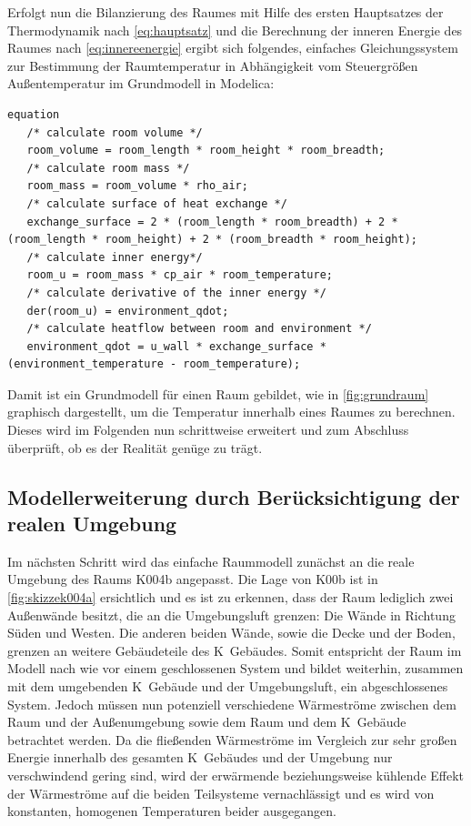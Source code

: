 Erfolgt nun die Bilanzierung des Raumes mit Hilfe des ersten Hauptsatzes der Thermodynamik nach \ref{eq:hauptsatz} und die Berechnung der inneren Energie des Raumes nach \ref{eq:innereenergie} ergibt sich folgendes, einfaches Gleichungssystem zur Bestimmung der Raumtemperatur in Abhängigkeit vom Steuergrößen Außentemperatur im Grundmodell in Modelica:

\begin{lstlisting}[language=Modelica,caption={Einfaches Gleichungssystem für das Grundmodell des Raumes in Modelica}, label=lst:grundraum]
equation
   /* calculate room volume */
   room_volume = room_length * room_height * room_breadth;
   /* calculate room mass */
   room_mass = room_volume * rho_air;
   /* calculate surface of heat exchange */
   exchange_surface = 2 * (room_length * room_breadth) + 2 * (room_length * room_height) + 2 * (room_breadth * room_height);
   /* calculate inner energy*/
   room_u = room_mass * cp_air * room_temperature;
   /* calculate derivative of the inner energy */
   der(room_u) = environment_qdot;
   /* calculate heatflow between room and environment */
   environment_qdot = u_wall * exchange_surface * (environment_temperature - room_temperature);
\end{lstlisting}

Damit ist ein Grundmodell für einen Raum gebildet, wie in \ref{fig:grundraum} graphisch dargestellt, um die Temperatur innerhalb eines Raumes zu berechnen. Dieses wird im Folgenden nun schrittweise erweitert und zum Abschluss überprüft, ob es der Realität genüge zu trägt.


\subsection{Modellerweiterung durch Berücksichtigung der realen Umgebung}

Im nächsten Schritt wird das einfache Raummodell zunächst an die reale Umgebung des Raums K004b angepasst. Die Lage von K00b ist in \ref{fig:skizzek004a} ersichtlich und es ist zu erkennen, dass der Raum lediglich zwei Außenwände besitzt, die an die Umgebungsluft grenzen: Die Wände in Richtung Süden und Westen. Die anderen beiden Wände, sowie die Decke und der Boden, grenzen an weitere Gebäudeteile des K~Gebäudes. Somit entspricht der Raum im Modell nach wie vor einem geschlossenen System und bildet weiterhin, zusammen mit dem umgebenden K~Gebäude und der Umgebungsluft, ein abgeschlossenes System. Jedoch müssen nun potenziell verschiedene Wärmeströme zwischen dem Raum und der Außenumgebung sowie dem Raum und dem K~Gebäude betrachtet werden. Da die fließenden Wärmeströme im Vergleich zur sehr großen Energie innerhalb des gesamten K~Gebäudes und der Umgebung nur verschwindend gering sind, wird der erwärmende beziehungsweise kühlende Effekt der Wärmeströme auf die beiden Teilsysteme vernachlässigt und es wird von konstanten, homogenen Temperaturen beider ausgegangen.

